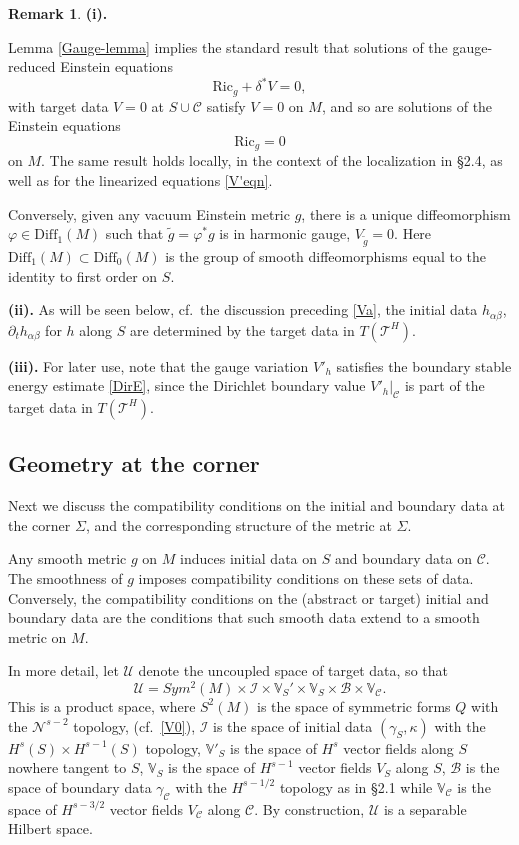 \documentclass[10pt]{amsart}
\renewcommand{\a}{\alpha}
\renewcommand{\b}{\beta}
\newcommand{\g}{\gamma}
\renewcommand{\d}{\delta}
\newcommand{\f}{\varphi}
\newcommand{\Si}{\Sigma}
\renewcommand{\k}{\kappa}
\newcommand{\cC}{{\mathcal C}}
\newcommand{\cT}{{\mathcal T}}
\newcommand{\cB}{{\mathcal B}}
\newcommand{\cU}{{\mathcal U}}
\newcommand{\cN}{{\mathcal N}}
\newcommand{\cI}{\mathcal I}
\newcommand{\bV}{\mathbb V}
\newcommand{\Diff}{\mathrm{Diff}}
\newcommand{\Ric}{\mathrm{Ric}}
\newcommand{\p}{\partial}
\newcommand{\<}{\langle}
\renewcommand{\>}{\rangle}
\newcommand{\w}{\widetilde}
\theoremstyle{plain}
\theoremstyle{remark}
\theoremstyle{definition}
\newtheorem{remark}[lemma]{Remark}
\numberwithin{equation}{section}
\begin{document}
\begin{remark} \label{gaugerem} 
{\bf (i).}
{\rm Lemma \ref{Gauge-lemma} implies the standard result that solutions of the gauge-reduced Einstein equations 
$$\Ric_g + \d^*V = 0,$$
with target data $ V = 0$ at $S\cup \cC$ satisfy $V = 0$ on $M$, and so are solutions of the Einstein equations 
$$\Ric_g = 0$$
on $M$. The same result holds locally, in the context of the localization in \S 2.4, as well as for the linearized equations \eqref{V'eqn}. 

  Conversely, given any vacuum Einstein metric $g$, there is a unique diffeomorphism $\f \in \Diff_1(M)$ such that $\w g = \f^*g$ is in 
harmonic gauge, $V_{\w g} = 0$. Here $\Diff_1(M) \subset \Diff_0(M)$ is the group of smooth diffeomorphisms equal to the identity to 
first order on $S$. 
 
{\bf (ii).} As will be seen below, cf.~the discussion preceding \eqref{Va}, the initial data $h_{\a\b}$, $\p_t h_{\a\b}$ for $h$ along $S$ are determined 
by the target data in $T(\cT^H)$. 

{\bf (iii).} For later use, note that the gauge variation $V'_h$ satisfies the boundary stable energy estimate \eqref{DirE}, since the Dirichlet boundary 
value $V'_h |_{\cC}$ is part of the target data in $T(\cT^H)$. 

}
\end{remark}
  

\subsection{Geometry at the corner}
Next we discuss the compatibility conditions on the initial and boundary data at the corner $\Si$, and the corresponding structure of the metric 
at $\Si$. 

  Any smooth metric $g$ on $M$ induces initial data on $S$ and boundary data on $\cC$. The smoothness of $g$ imposes compatibility 
conditions on these sets of data. Conversely, the compatibility conditions on the (abstract or target) initial and boundary data are the conditions 
that such smooth data extend to a smooth metric on $M$. 
 
    In more detail, let $\cU$ denote the uncoupled space of target data, so that 
 $$\cU =  Sym^2(M) \times \cI \times \bV_S' \times \bV_S \times \cB \times \bV_{\cC}.$$
This is a product space, where $S^2(M)$ is the space of symmetric forms $Q$ with the $\cN^{s-2}$ topology, (cf.~\eqref{V0}), $\cI$ is the space of 
initial data $(\g_S, \k)$ with the $H^s(S) \times H^{s-1}(S)$ topology, $\bV'_S$ is the space of $H^s$ vector fields along $S$ nowhere tangent to $S$, 
$\bV_S$ is the space of $H^{s-1}$ vector fields $V_S$ along $S$, $\cB$ is the space of boundary data $\g_{\cC}$ with the $H^{s-1/2}$ topology as in \S 2.1 
while $\bV_{\cC}$ is the space of $H^{s-3/2}$ vector fields $V_{\cC}$ along $\cC$. By construction, $\cU$ is a separable Hilbert space. 
\end{document}

